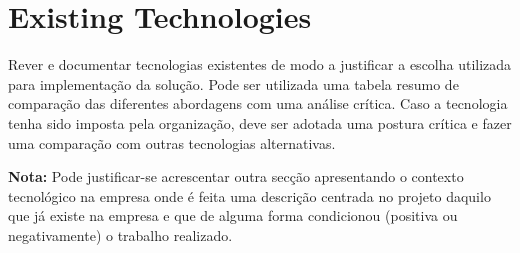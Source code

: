 \section{Existing Technologies} %
\label{sec:technologies}

Rever e documentar tecnologias existentes de modo a justificar a escolha utilizada para implementação da solução. Pode ser utilizada uma tabela resumo de comparação das diferentes abordagens com uma análise crítica. Caso a tecnologia tenha sido imposta pela organização, deve ser adotada uma postura crítica e fazer uma comparação com outras tecnologias alternativas.

\textbf{Nota:} Pode justificar-se acrescentar outra secção apresentando o contexto tecnológico na empresa onde é feita uma descrição centrada no projeto daquilo que já existe na empresa e que de alguma forma condicionou (positiva ou negativamente) o trabalho realizado.
